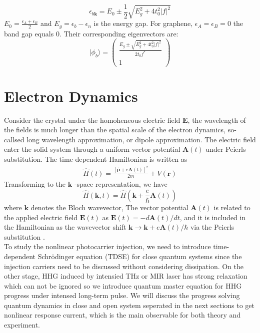 \begin{equation}
\epsilon_{b\mathbf{k}}=E_{0} \pm \frac{1}{2} \sqrt{E_{g}^{2}+4t_{0}^{2}|f|^{2}}
\label{eigenvalues}
\end{equation}
$E_{0}=\frac{\epsilon_{A}+\epsilon_{B}}{2}$ and $E_{g}=\epsilon_{b}-\epsilon_{n}$ is the energy gap. For graphene, $\epsilon_{A} = \epsilon_{B} =0$ the band gap equals 0.
Their corresponding eigenvectors are:
\begin{equation}
    |\phi_{b}\rangle  =\left(\begin{array}{cc}
 \frac{E_{g} \pm \sqrt{E_{g}^{2}+4t_{0}^{2}|f|^{2}}}{2t_{0} f^*}\\
1
\end{array}\right)
\label{eqn:eigenvector}
\end{equation}

\section{Electron Dynamics}
Consider the crystal under the homoheneous electric field $\mathbf {E}$, the wavelength of the fields
is much longer than the spatial scale of the electron dynamics, so-callsed long wavelength approximation, or dipole approximation. The electric field enter the solid system through a uniform
vector potential $\mathbf {A} (t)$ under Peierls substitution\cite{hofstadter1976energy}. The time-dependent Hamiltonian is written as
\begin{align}
\hat{H}(t)=\frac{[\hat{\mathbf{p}}+e \mathbf{A}(t)]^{2}}{2 m}+V(\mathbf{r})
\end{align}
Transforming to the $\mathbf{k}$ -space representation, we have
\begin{equation}
     \hat{H}(\mathbf{k}, t)=\hat{H}\left(\mathbf{k}+\frac{e}{\hbar} \mathbf{A}(t)\right)
     \label{eqn:vTD}
\end{equation}
where $\mathbf k$ denotes the Bloch wavevector, The vector potential $\mathbf A(t)$ is related to the applied electric field $\mathbf E(t)$ as $\mathbf E(t)=-d\mathbf A(t)/dt$, and it is included in the Hamiltonian as the wavevector shift $\mathbf k \rightarrow \mathbf k + e\mathbf A(t)/\hbar$ via the Peierls substitution  \cite{hofstadter1976energy}.\\

To study the nonlinear photocarrier injection, we need to introduce time-dependent Schr\"odinger
equation (\gls {TDSE}) for close quantum systems since the injection carriers need to be discussed
without considering dissipation. On the other stage, HHG induced by intensied THz or MIR laser has
strong relaxation which can not be ignored so we introduce quantum master equation for HHG progress
under intensed long-term pulse. We will discuss the progress solving quantum dynamics in close and
open system seperated in the next sections to get nonlinear response current, which is the main
observable for both theory and experiment. 
